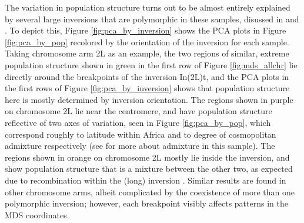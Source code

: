 \documentclass[11pt, oneside]{article}   	%
\begin{document}
The variation in population structure turns out to be almost entirely explained by
several large inversions that are polymorphic in these samples, 
disussed in \citet{corbett2012population} and \citet{langley2012genomic}.
To depict this, Figure \ref{fig:pca_by_inversion} shows
the PCA plots in Figure \ref{fig:pca_by_pop} recolored by the orientation of the inversion for each sample.
Taking chromosome arm 2L as an example,
the two regions of similar, extreme population structure
shown in green in the first row of Figure \ref{fig:mds_allchr}
lie directly around the breakpoints of the inversion In(2L)t,
and the PCA plots in the first rows of Figure \ref{fig:pca_by_inversion}
shows that population structure here is mostly determined by inversion orientation.
The regions shown in purple on chromosome 2L lie near the centromere,
and have population structure reflective of two axes of variation,
seen in Figure \ref{fig:pca_by_pop},
which correspond roughly to latitude within Africa and to degree of cosmopolitan admixture respectively
(see \citet{lack2015drosophila} for more about admixture in this sample).
The regions shown in orange on chromosome 2L mostly lie inside the inversion,
and show population structure that is a mixture between the other two,
as expected due to recombination within the (long) inversion \citep{guerrero2011coalescent}.
Similar results are found in other chromosome arms,
albeit complicated by the coexistence of more than one polymorphic inversion;
however, each breakpoint visibly affects patterns in the MDS coordinates.
\end{document}
